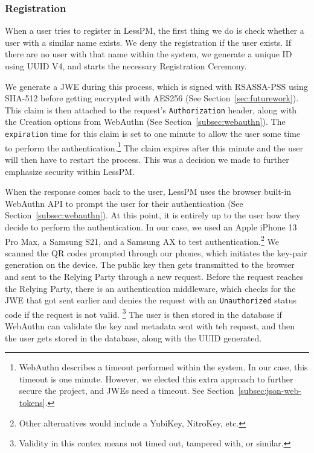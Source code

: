 \subsubsection{Registration}
When a user tries to register in LessPM, the first thing we do is check
whether a user with a similar name exists.
We deny the registration if the user exists.
If there are no user with that name within the system, we generate a unique ID
using UUID V4, and starts the necessary Registration Ceremony.

We generate a JWE during this process, which is signed with RSASSA-PSS
using SHA-512 before getting encrypted with AES256 (See
Section~\ref{sec:futurework}).
This claim is then attached to the request's \texttt{Authorization} header,
along with the Creation options from WebAuthn (See
Section~\ref{subsec:webauthn}).
The \texttt{expiration} time for this claim is set to one minute to allow the
user some time to perform the authentication.\footnote{
  WebAuthn describes a timeout performed within the system. In our case, this
  timeout is one minute.
  However, we elected this extra approach to further secure the project, and
  JWEs need a timeout. See Section~\ref{subsec:json-web-tokens}.
}
The claim expires after this minute and the user will then have to restart the
process.
This was a decision we made to further emphasize security within LessPM\@.

When the response comes back to the user, LessPM uses the browser built-in
WebAuthn API to prompt the user for their authentication (See
Section~\ref{subsec:webauthn}).
At this point, it is entirely up to the user how they decide to perform the
authentication.
In our case, we used an Apple iPhone 13 Pro Max, a Samsung S21, and a Samsung
AX  to test authentication.\footnote{
  Other alternatives would include a YubiKey, NitroKey, etc.
}
We scanned the QR codes prompted through our phones, which initiates the
key-pair generation on the device.
The public key then gets transmitted to the browser and sent to the Relying
Party through a new request.
Before the request reaches the Relying Party, there is an authentication
middleware, which checks for the JWE that got sent earlier and denies the
request with an \texttt{Unauthorized} status code if the request is not valid.
\footnote{
  Validity in this contex means not timed out, tampered with, or similar.
}
The user is then stored in the database if WebAuthn can validate the key and
metadata sent with teh request, and then the user gets stored in the database,
along with the UUID generated.

